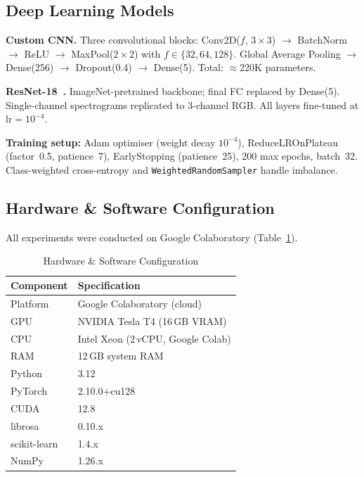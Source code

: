 \documentclass[conference]{IEEEtran}
\begin{document}
\subsection{Deep Learning Models}

\textbf{Custom CNN.}
Three convolutional blocks: Conv2D($f$, $3{\times}3$) $\to$ BatchNorm
$\to$ ReLU $\to$ MaxPool($2{\times}2$) with $f\in\{32,64,128\}$.
Global Average Pooling $\to$ Dense(256) $\to$ Dropout(0.4)
$\to$ Dense(5). Total: $\approx$220K parameters.

\textbf{ResNet-18~\cite{he2016}.}
ImageNet-pretrained backbone; final FC replaced by Dense(5). Single-channel
spectrograms replicated to 3-channel RGB. All layers fine-tuned at
$\text{lr}=10^{-4}$.

\textbf{Training setup:}
Adam optimiser (weight decay $10^{-4}$), ReduceLROnPlateau (factor~0.5,
patience~7), EarlyStopping (patience~25), 200 max epochs, batch~32.
Class-weighted cross-entropy and \texttt{WeightedRandomSampler} handle
imbalance.

\subsection{Hardware \& Software Configuration}

All experiments were conducted on Google Colaboratory
(Table~\ref{tab:hw}).

\begin{table}[t]
  \caption{Hardware \& Software Configuration}
  \label{tab:hw}
  \centering
  \begin{tabular}{ll}
    \toprule
    \textbf{Component} & \textbf{Specification} \\
    \midrule
    Platform      & Google Colaboratory (cloud) \\
    GPU           & NVIDIA Tesla T4 (16\,GB VRAM) \\
    CPU           & Intel Xeon (2\,vCPU, Google Colab) \\
    RAM           & 12\,GB system RAM \\
    Python        & 3.12 \\
    PyTorch       & 2.10.0+cu128 \\
    CUDA          & 12.8 \\
    librosa       & 0.10.x \\
    scikit-learn  & 1.4.x \\
    NumPy         & 1.26.x \\
    \bottomrule
  \end{tabular}
\end{table}
\end{document}
